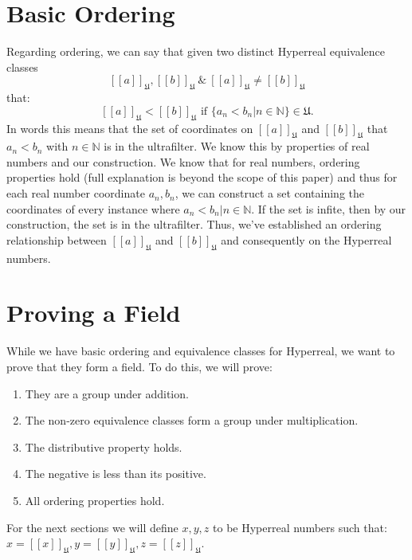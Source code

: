 \documentclass[12pt]{report}
\newcommand{\N}{\mathbb{N}}
\newcommand{\U}{\mathfrak{U}}
\begin{document}
\section*{Basic Ordering}
Regarding ordering, we can say that given two distinct Hyperreal equivalence classes \[  [[a]]_{\U}, [[b]]_{\U} \ \& \ [[a]]_{\U}\not= [[b]]_{\U} \] that: \[ [[a]]_{\U}< [[b]]_{\U} \text{ if }\{a_n < b_n | n \in \N \} \in \U .\] In words this means that the set of coordinates on $[[a]]_{\U}$ and $[[b]]_{\U}$ that $a_n < b_n$ with $n \in \N $ is in the ultrafilter.
We know this by properties of real numbers and our construction.
We know that for real numbers, ordering properties hold (full explanation is beyond the scope of this paper) and thus for each real number coordinate $a_n, b_n$, we can construct a set containing the coordinates of every instance where $a_n < b_n | n \in \N$.
If the set is infite, then by our construction, the set is in the ultrafilter.
Thus, we've established an ordering relationship between $[[a]]_{\U}$ and $[[b]]_{\U}$ and consequently on the Hyperreal numbers.

\section*{Proving a Field}
While we have basic ordering and equivalence classes for Hyperreal, we want to prove that they form a field.
To do this, we will prove:
\begin{enumerate}
    \item They are a group under addition.
    \item The non-zero equivalence classes form a group under multiplication.
    \item The distributive property holds.
    \item The negative is less than its positive.
    \item All ordering properties hold.
\end{enumerate}
For the next sections we will define $x,y,z$ to be Hyperreal numbers such that:\\ $x =[[x]]_{\U}, y= [[y]]_{\U}, z=[[z]]_{\U}$.
\end{document}
